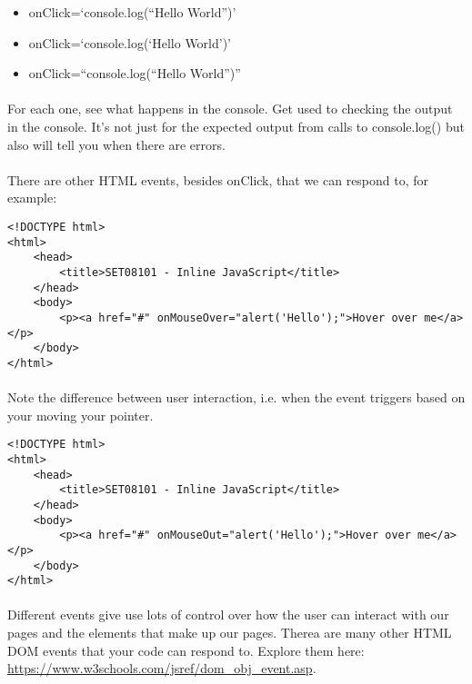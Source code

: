 \documentclass[10pt, a4paper]{article}
\begin{document}
\begin{itemize}
\item onClick=`console.log(``Hello World'')'
\item onClick=`console.log(`Hello World')'
\item onClick=``console.log(``Hello World'')''
\end{itemize}

\paragraph{} For each one, see what happens in the console. Get used to checking the output in the console. It's not just for the expected output from calls to console.log() but also will tell you when there are errors.

\paragraph{} There are other HTML events, besides onClick, that we can respond to, for example:

\begin{lstlisting}
<!DOCTYPE html>
<html>
    <head>
        <title>SET08101 - Inline JavaScript</title>
    </head>
    <body>
        <p><a href="#" onMouseOver="alert('Hello');">Hover over me</a></p> 
    </body>
</html>
\end{lstlisting}

\paragraph{} Note the difference between user interaction, i.e. when the event triggers based on your moving your pointer.

\begin{lstlisting}
<!DOCTYPE html>
<html>
    <head>
        <title>SET08101 - Inline JavaScript</title>
    </head>
    <body>
        <p><a href="#" onMouseOut="alert('Hello');">Hover over me</a></p> 
    </body>
</html>
\end{lstlisting}

\paragraph{} Different events give use lots of control over how the user can interact with our pages and the elements that make up our pages. Therea are many other HTML DOM events that your code can respond to. Explore them here: \url{https://www.w3schools.com/jsref/dom_obj_event.asp}.
\end{document}
